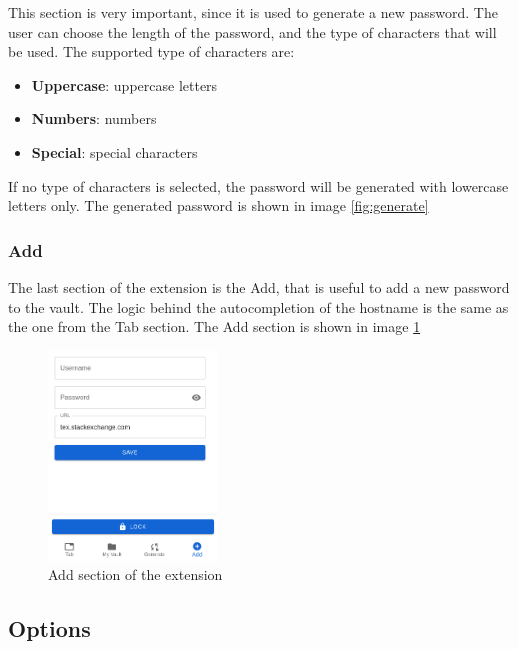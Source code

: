 This section is very important, since it is used to generate a new password. The user can choose the length of the password, and the type of characters that will be used. The supported type of characters are:

\begin{itemize}
    \item \textbf{Uppercase}: uppercase letters
    \item \textbf{Numbers}: numbers
    \item \textbf{Special}: special characters
\end{itemize}
If no type of characters is selected, the password will be generated with lowercase letters only.
The generated password is shown in image \ref{fig:generate}

\subsubsection{Add}

The last section of the extension is the Add, that is useful to add a new password to the vault. The logic behind the autocompletion of the hostname is the same as the one from the Tab section.
The Add section is shown in image \ref{fig:add}

\begin{figure}[h!]
    \centering
    \vspace{0.5cm}
    \includegraphics[width=0.4\textwidth]{images/extension/add.png}
    \caption{Add section of the extension}
    \label{fig:add} %
\end{figure}


\subsection{Options}

